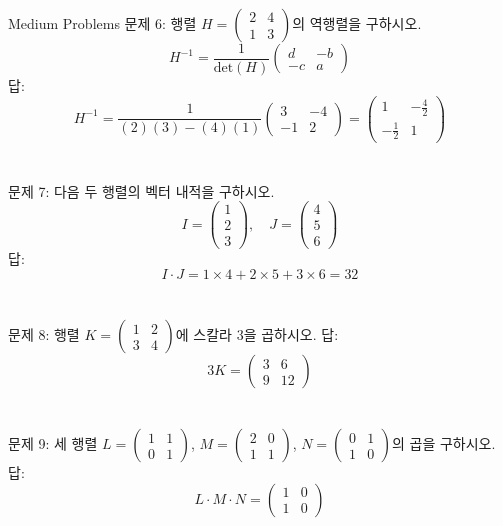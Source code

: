 \documentclass[fleqn]{article}
\begin{document}
 Medium Problems
\noindent 문제 6: 행렬 \(H = \begin{pmatrix}
2 & 4 \\
1 & 3 
\end{pmatrix}\)의 역행렬을 구하시오. 
\[
H^{-1} = \frac{1}{\text{det}(H)} \begin{pmatrix}
d & -b \\
-c & a 
\end{pmatrix}
\] \noindent 답: \\
\[
H^{-1} = \frac{1}{(2)(3) - (4)(1)} \begin{pmatrix}
3 & -4 \\
-1 & 2 
\end{pmatrix} = \begin{pmatrix}
1 & -\frac{4}{2} \\
-\frac{1}{2} & 1 
\end{pmatrix}
\] \\\\

\noindent 문제 7: 다음 두 행렬의 벡터 내적을 구하시오.
\[
I = \begin{pmatrix}
1 \\
2 \\
3 
\end{pmatrix}, \quad J = \begin{pmatrix}
4 \\
5 \\
6 
\end{pmatrix}
\] \noindent 답: \\
\[
I \cdot J = 1 \times 4 + 2 \times 5 + 3 \times 6 = 32
\] \\\\

\noindent 문제 8: 행렬 \(K = \begin{pmatrix}
1 & 2 \\
3 & 4 
\end{pmatrix}\)에 스칼라 \(3\)을 곱하시오. \noindent 답: \\
\[
3K = \begin{pmatrix}
3 & 6 \\
9 & 12 
\end{pmatrix}
\] \\\\

\noindent 문제 9: 세 행렬 \(L = \begin{pmatrix}
1 & 1 \\
0 & 1 
\end{pmatrix}\), \(M = \begin{pmatrix}
2 & 0 \\
1 & 1 
\end{pmatrix}\), \(N = \begin{pmatrix}
0 & 1 \\
1 & 0 
\end{pmatrix}\)의 곱을 구하시오. \noindent 답: \\
\[
L \cdot M \cdot N = \begin{pmatrix}
1 & 0 \\
1 & 0 
\end{pmatrix}
\] \\\\
\end{document}
